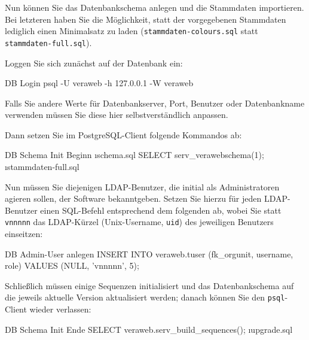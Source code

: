 \documentclass{tarentanleitung}
\begin{document}
Nun können Sie das Datenbankschema anlegen und die Stammdaten importieren.
Bei letzteren haben Sie die Möglichkeit, statt der vorgegebenen Stammdaten
lediglich einen Minimalsatz zu laden (\texttt{stammdaten-colours.sql} statt
\texttt{stammdaten-full.sql}).

\begin{minipage}{\linewidth}
Loggen Sie sich zunächst auf der Datenbank ein:

\begin{lstdump}{DB Login}
psql -U veraweb -h 127.0.0.1 -W veraweb
\end{lstdump}
\end{minipage}

Falls Sie andere Werte für Datenbankserver, Port, Benutzer oder Datenbankname
verwenden müssen Sie diese hier selbstverständlich anpassen.

\begin{minipage}{\linewidth}
Dann setzen Sie im PostgreSQL-Client folgende Kommandos ab:

\begin{lstdump}{DB Schema Init Beginn}
\i schema.sql
SELECT serv_verawebschema(1);
\i stammdaten-full.sql
\end{lstdump}
\end{minipage}

\begin{minipage}{\linewidth}
Nun müssen Sie diejenigen LDAP-Benutzer, die initial als Administratoren
agieren sollen, der Software bekanntgeben. Setzen Sie hierzu für jeden
LDAP-Benutzer einen SQL-Befehl entsprechend dem folgenden ab, wobei Sie
statt \texttt{vnnnnn} das LDAP-Kürzel (Unix-Username, \texttt{uid}) des
jeweiligen Benutzers einseitzen:

\begin{lstdump}[language=SQL]{DB Admin-User anlegen}
INSERT INTO veraweb.tuser (fk_orgunit, username, role)
    VALUES (NULL, 'vnnnnn', 5);
\end{lstdump}\label{manual:db-user}
\end{minipage}

\begin{minipage}{\linewidth}
Schließlich müssen einige Sequenzen initialisiert und das Datenbankschema
auf die jeweils aktuelle Version aktualisiert werden; danach können Sie
den \texttt{psql}-Client wieder verlassen:

\begin{lstdump}{DB Schema Init Ende}
SELECT veraweb.serv_build_sequences();
\i upgrade.sql
\q
\end{lstdump}
\end{minipage}
\end{document}
